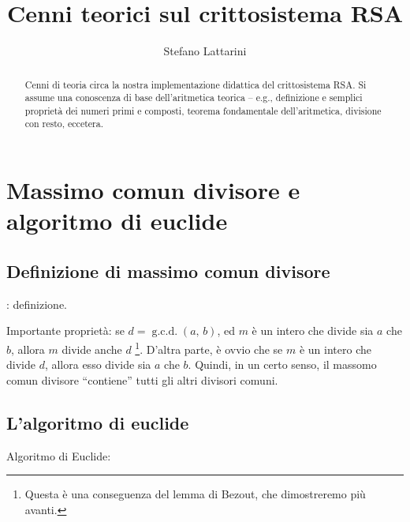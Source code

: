 \documentclass[pdflatex,11pt,a4paper,oneside]{article}
\newcommand{\theauthor}[0]{Stefano Lattarini}
\newcommand{\thetitle}[0]{Cenni teorici sul crittosistema RSA}
\newcommand{\XXX}[1][XXX]{\text{\bfseries{\color{red}{\emph{#1}}}}}
\newcommand{\TODO}[0]{\XXX[TODO]}
\newcommand{\gcdop}[0]{\ensuremath{\operatorname{g.c.d.}}}
\newcommand{\xgcd}[1]{\ensuremath{\gcdop\left({#1}\right)}}
\renewcommand{\gcd}[2]{\xgcd{{#1},\,{#2}}}
\begin{document}
\title{\thetitle}
\author{\theauthor}

\maketitle


\begin{abstract}
  Cenni di teoria circa la nostra implementazione didattica del
  crittosistema RSA.  Si assume una conoscenza di base dell'aritmetica
  teorica -- e.g., definizione e semplici propriet\`a dei numeri primi
  e composti, teorema fondamentale dell'aritmetica, divisione con resto,
  eccetera.
\end{abstract}


\section{Massimo comun divisore e algoritmo di euclide}


\subsection{Definizione di massimo comun divisore}

\TODO: definizione.

Importante propriet\`a: se $d = \gcd{a}{b}$, ed $m$ \`e un intero che
divide sia $a$ che $b$, allora $m$ divide anche $d$%
\footnote{%
  Questa \`e una conseguenza del lemma di Bezout, che dimostreremo
  pi\`u avanti.%
}.
D'altra parte, \`e ovvio che se $m$ \`e un intero che divide $d$, allora
esso divide sia $a$ che $b$.
Quindi, in un certo senso, il massomo comun divisore ``contiene'' tutti
gli altri divisori comuni.


\subsection{L'algoritmo di euclide}

Algoritmo di Euclide:

\TODO
\end{document}
